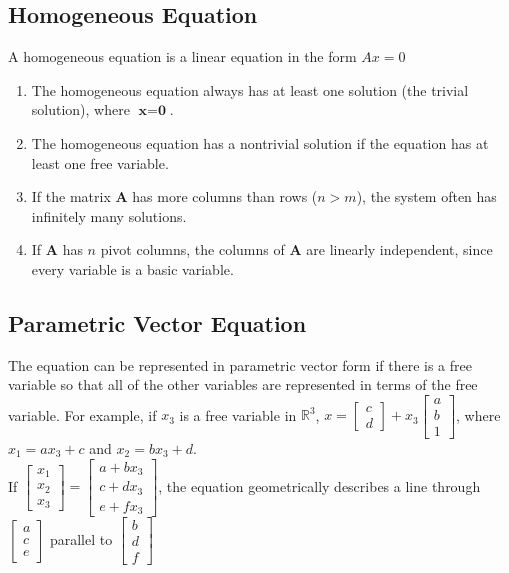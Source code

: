 \documentclass{article}
\begin{document}
\subsection*{Homogeneous Equation}
A homogeneous equation is a linear equation in the form $Ax=0$

\begin{enumerate}
    \item The homogeneous equation always has at least one solution (the trivial solution), where
    $\textbf{x}=\textbf{0}$.
    \item The homogeneous equation has a nontrivial solution if the equation has at least one free
    variable.
    \item If the matrix $\textbf{A}$ has more columns than rows ($n > m$), the system often has
    infinitely many solutions.
    \item If $\textbf{A}$ has $n$ pivot columns, the columns of $\textbf{A}$ are linearly
    independent, since every variable is a basic variable.
\end{enumerate}

\subsection*{Parametric Vector Equation}
The equation can be represented in parametric vector form if there is a free variable so that all
of the other variables are represented in terms of the free variable. For example, if $x_3$ is a
free variable in $\mathbb{R}^3$, 
$x=\begin{bmatrix} c \\ d \end{bmatrix} + x_3
\begin{bmatrix} a \\ b \\ 1\end{bmatrix}$, 
where $x_1=ax_3 + c$ and $x_2=bx_3 + d$.\\

If $\begin{bmatrix}
    x_1 \\ x_2 \\ x_3
\end{bmatrix} = \begin{bmatrix}
    a + bx_3 \\ c + dx_3 \\ e + fx_3
\end{bmatrix}$, the equation geometrically describes a line through $\begin{bmatrix}
    a \\ c \\ e
\end{bmatrix}$ parallel to $\begin{bmatrix}
    b \\ d \\ f
\end{bmatrix}$
\end{document}
